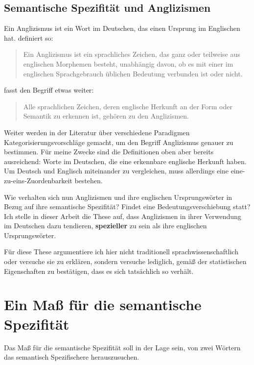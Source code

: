 \documentclass[11pt,numbers=noenddot]{scrartcl}
\begin{document}
\subsection*{Semantische Spezifität und Anglizismen}

Ein Anglizismus ist ein Wort im Deutschen, das einen Ursprung im Englischen hat. \citet[S. 38]{schütte1996schöne} definiert so:

\begin{quote}
    Ein Anglizismus ist ein sprachliches Zeichen, das ganz oder teilweise aus englischen Morphemen besteht, unabhängig davon, ob es mit einer im englischen Sprachgebrauch üblichen Bedeutung verbunden ist oder nicht.
\end{quote}

\noindent \citet[S. 216]{burmasova2010empirische} fasst den Begriff etwas weiter:
\begin{quote}
    Alle sprachlichen Zeichen, deren englische Herkunft an der Form oder Semantik zu erkennen ist, gehören zu den Anglizismen.
\end{quote}

Weiter werden in der Literatur über verschiedene Paradigmen Kategorisierungsvorschläge gemacht, um den Begriff Anglizismus genauer zu bestimmen. Für meine Zwecke sind die Definitionen oben aber bereits ausreichend: Worte im Deutschen, die eine erkennbare englische Herkunft haben. Um Deutsch und Englisch miteinander zu vergleichen, muss allerdings eine eine-zu-eins-Zuordenbarkeit bestehen.

Wie verhalten sich nun Anglizismen und ihre englischen Ursprungswörter in Bezug auf ihre semantische Spezifität? Findet eine Bedeutungsverschiebung statt? Ich stelle in dieser Arbeit die These auf, dass Anglizismen in ihrer Verwendung im Deutschen dazu tendieren, \textbf{spezieller} zu sein als ihre englischen Ursprungswörter.

Für diese These argumentiere ich hier nicht traditionell sprachwissenschaftlich oder versuche sie zu erklären, sondern versuche lediglich, gemäß der statistischen Eigenschaften zu bestätigen, dass es sich tatsächlich so verhält.
\section{Ein Maß für die semantische Spezifität}

Das Maß für die semantische Spezifität soll in der Lage sein, von zwei Wörtern das semantisch Spezifischere herauszusuchen.
\end{document}
